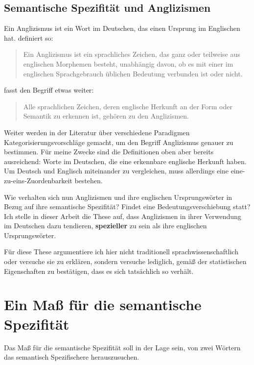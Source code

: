 \documentclass[11pt,numbers=noenddot]{scrartcl}
\begin{document}
\subsection*{Semantische Spezifität und Anglizismen}

Ein Anglizismus ist ein Wort im Deutschen, das einen Ursprung im Englischen hat. \citet[S. 38]{schütte1996schöne} definiert so:

\begin{quote}
    Ein Anglizismus ist ein sprachliches Zeichen, das ganz oder teilweise aus englischen Morphemen besteht, unabhängig davon, ob es mit einer im englischen Sprachgebrauch üblichen Bedeutung verbunden ist oder nicht.
\end{quote}

\noindent \citet[S. 216]{burmasova2010empirische} fasst den Begriff etwas weiter:
\begin{quote}
    Alle sprachlichen Zeichen, deren englische Herkunft an der Form oder Semantik zu erkennen ist, gehören zu den Anglizismen.
\end{quote}

Weiter werden in der Literatur über verschiedene Paradigmen Kategorisierungsvorschläge gemacht, um den Begriff Anglizismus genauer zu bestimmen. Für meine Zwecke sind die Definitionen oben aber bereits ausreichend: Worte im Deutschen, die eine erkennbare englische Herkunft haben. Um Deutsch und Englisch miteinander zu vergleichen, muss allerdings eine eine-zu-eins-Zuordenbarkeit bestehen.

Wie verhalten sich nun Anglizismen und ihre englischen Ursprungswörter in Bezug auf ihre semantische Spezifität? Findet eine Bedeutungsverschiebung statt? Ich stelle in dieser Arbeit die These auf, dass Anglizismen in ihrer Verwendung im Deutschen dazu tendieren, \textbf{spezieller} zu sein als ihre englischen Ursprungswörter.

Für diese These argumentiere ich hier nicht traditionell sprachwissenschaftlich oder versuche sie zu erklären, sondern versuche lediglich, gemäß der statistischen Eigenschaften zu bestätigen, dass es sich tatsächlich so verhält.
\section{Ein Maß für die semantische Spezifität}

Das Maß für die semantische Spezifität soll in der Lage sein, von zwei Wörtern das semantisch Spezifischere herauszusuchen.
\end{document}
